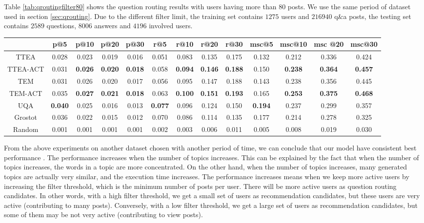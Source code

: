 {{{{{{{Table \ref{tab:qroutingfilter80} shows the question routing results with users having more than 80 posts. We use the same period of dataset used in section \ref{sec:qrouting}. Due to the different filter limit, the training set contains $1275$ users and $216940$ q\&a posts, the testing set contains $2589$ questions, $8006$ answers and $4196$ involved users.
\begin{sidewaystable}
\caption{Question Routing experiments,  with users having more than 80 posts}
\label{tab:qroutingfilter80}
\centering
\begin{tabular}{|c|c|c|c|c|c|c|c|c|c|c|c|c|}
\hline
 & p@5    &p@10    &p@20   & p@30 &r@5 & r@10 & r@20 &r@30 & msc@5 & msc@10 &msc @20 &msc@30  \\ \hline
TTEA&0.028&0.023&0.019&0.016&0.051&0.083&0.135&0.175&0.132&0.212&0.336&0.424 \\ \hline
TTEA-ACT&0.031&\textbf{0.026}&\textbf{0.020}&\textbf{0.018}&0.058&\textbf{0.094}&\textbf{0.146}&\textbf{0.188}&0.150&\textbf{0.238}&\textbf{0.364}&\textbf{0.457} \\ \hline
TEM&0.031&0.026&0.020&0.017&0.056&0.095&0.147&0.188&0.143&0.238&0.356&0.445 \\ \hline
TEM-ACT&0.035&\textbf{0.027}&\textbf{0.021}&\textbf{0.018}&0.063&\textbf{0.100}&\textbf{0.151}&\textbf{0.193}&0.165  &\textbf{0.253}&\textbf{0.375}&\textbf{0.468} \\ \hline
UQA&\textbf{0.040}&0.025&0.016&0.013&\textbf{0.077}&0.096&0.124&0.150&\textbf{0.194}&0.237&0.299&0.357 \\ \hline
Grostot&0.036&0.022&0.015&0.012&0.070&0.086&0.114&0.135&0.177&0.214&0.278&0.325 \\ \hline
Random&0.001&0.001&0.001&0.001&0.002&0.003&0.006&0.011&0.005&0.008&0.019&0.030 \\ \hline
\end{tabular}
\end{sidewaystable}


From the above experiments on another dataset chosen with another period of time, we can conclude that our model have consistent best performance . 
The performance increases when the number of topics increases. This can be explained by the fact that when the number of topics increases, the words in a topic are more concentrated. On the other hand, when the number of topics increases, many generated topics are actually very similar, and the execution time increases. 
The performance increases means when we keep more active users by increasing the filter threshold, which is the minimum number of posts per user. There will be more active users as question routing candidates. In other words, with a high filter threshold, we get a small set of users as recommendation candidates, but these users are very active (contributing to many posts). Conversely, with a low filter threshold, we get a large set of users as recommendation candidates, but some of them may be not very active (contributing to view posts). 



}}}}}}}
